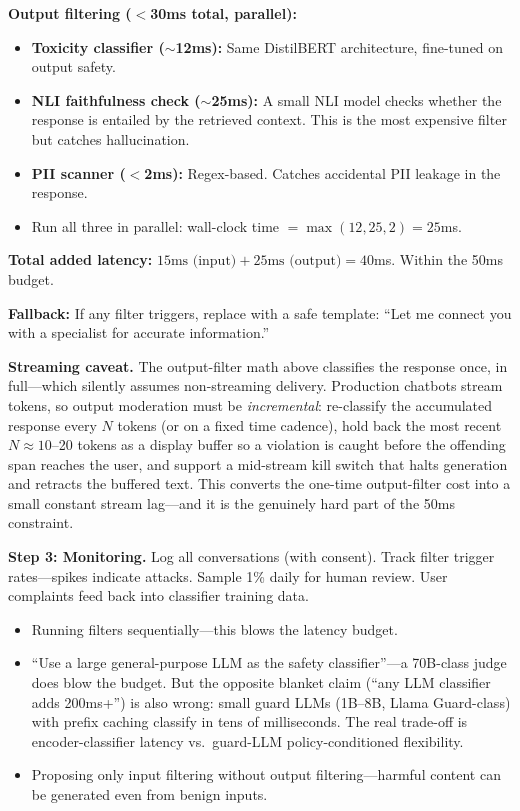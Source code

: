 \begin{interviewq}
\textbf{Output filtering ($<$30ms total, parallel):}
\begin{itemize}
    \item \textbf{Toxicity classifier ($\sim$12ms):} Same DistilBERT architecture, fine-tuned on output safety.
    \item \textbf{NLI faithfulness check ($\sim$25ms):} A small NLI model checks whether the response is entailed by the retrieved context. This is the most expensive filter but catches hallucination.
    \item \textbf{PII scanner ($<$2ms):} Regex-based. Catches accidental PII leakage in the response.
    \item Run all three in parallel: wall-clock time $= \max(12, 25, 2) = 25$ms.
\end{itemize}

\textbf{Total added latency:} $15\text{ms (input)} + 25\text{ms (output)} = 40$ms. Within the 50ms budget.

\textbf{Fallback:} If any filter triggers, replace with a safe template: ``Let me connect you with a specialist for accurate information.''

\textbf{Streaming caveat.} The output-filter math above classifies the response once, in full---which silently assumes non-streaming delivery. Production chatbots stream tokens, so output moderation must be \textit{incremental}: re-classify the accumulated response every $N$ tokens (or on a fixed time cadence), hold back the most recent $N \approx 10$--20 tokens as a display buffer so a violation is caught before the offending span reaches the user, and support a mid-stream kill switch that halts generation and retracts the buffered text. This converts the one-time output-filter cost into a small constant stream lag---and it is the genuinely hard part of the 50ms constraint.

\textbf{Step 3: Monitoring.} Log all conversations (with consent). Track filter trigger rates---spikes indicate attacks. Sample 1\% daily for human review. User complaints feed back into classifier training data.

\redflags
\begin{itemize}
    \item Running filters sequentially---this blows the latency budget.
    \item ``Use a large general-purpose LLM as the safety classifier''---a 70B-class judge does blow the budget. But the opposite blanket claim (``any LLM classifier adds 200ms+'') is also wrong: small guard LLMs (1B--8B, Llama Guard-class) with prefix caching classify in tens of milliseconds. The real trade-off is encoder-classifier latency vs.\ guard-LLM policy-conditioned flexibility.
    \item Proposing only input filtering without output filtering---harmful content can be generated even from benign inputs.
\end{itemize}


\end{interviewq}
